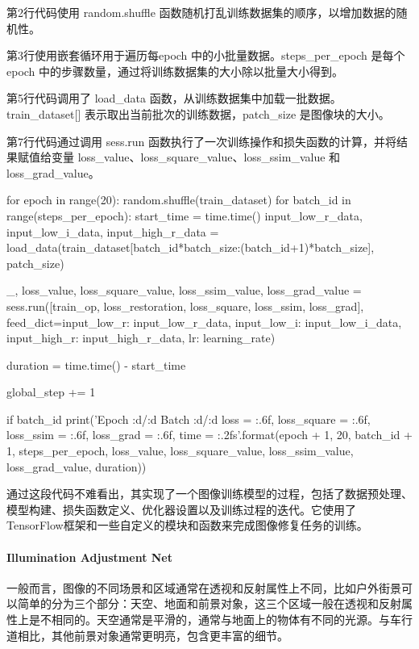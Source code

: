 \documentclass[letterpaper,12pt]{article}
\begin{document}
				第2行代码使用 random.shuffle 函数随机打乱训练数据集的顺序，以增加数据的随机性。
				
				第3行使用嵌套循环用于遍历每epoch 中的小批量数据。steps\_per\_epoch 是每个 epoch 中的步骤数量，通过将训练数据集的大小除以批量大小得到。
				
				第5行代码调用了 load\_data 函数，从训练数据集中加载一批数据。train\_dataset[] 表示取出当前批次的训练数据，patch\_size 是图像块的大小。

				第7行代码通过调用 sess.run 函数执行了一次训练操作和损失函数的计算，并将结果赋值给变量 loss\_value、loss\_square\_value、loss\_ssim\_value 和 loss\_grad\_value。
				
				\begin{python}
				for epoch in range(20):
					random.shuffle(train_dataset)
				for batch_id in range(steps_per_epoch):
					start_time = time.time()					
					input_low_r_data, input_low_i_data, input_high_r_data = load_data(train_dataset[batch_id*batch_size:(batch_id+1)*batch_size], patch_size)
					
					_, loss_value, loss_square_value, loss_ssim_value, loss_grad_value = sess.run([train_op, loss_restoration, loss_square, loss_ssim, loss_grad], feed_dict={input_low_r: input_low_r_data, input_low_i: input_low_i_data, input_high_r: input_high_r_data, lr: learning_rate})
					
					duration = time.time() - start_time
					
					global_step += 1
					
					if batch_id %
						print('Epoch {:d}/{:d} Batch {:d}/{:d} loss = {:.6f}, loss_square = {:.6f}, loss_ssim = {:.6f}, loss_grad = {:.6f}, time = {:.2f}s'.format(epoch + 1, 20, batch_id + 1, steps_per_epoch, loss_value, loss_square_value, loss_ssim_value, loss_grad_value, duration))
				\end{python}
				
				通过这段代码不难看出，其实现了一个图像训练模型的过程，包括了数据预处理、模型构建、损失函数定义、优化器设置以及训练过程的迭代。它使用了TensorFlow框架和一些自定义的模块和函数来完成图像修复任务的训练。
				
				
			\paragraph{Illumination Adjustment Net}
		
				一般而言，图像的不同场景和区域通常在透视和反射属性上不同，比如户外街景可以简单的分为三个部分：天空、地面和前景对象，这三个区域一般在透视和反射属性上是不相同的。天空通常是平滑的，通常与地面上的物体有不同的光源。与车行道相比，其他前景对象通常更明亮，包含更丰富的细节。
		
\end{document}

